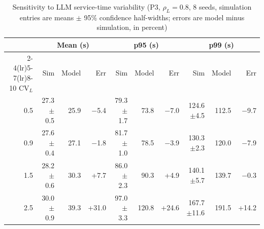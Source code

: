 \documentclass[journal]{IEEEtran}
\begin{document}
\begin{table}[t]
\caption{Sensitivity to LLM service-time variability (P3, $\rho_L=0.8$, 8 seeds, simulation entries are means $\pm$ 95\% confidence half-widths; errors are model minus simulation, in percent)}
\label{tab:cv}
\centering
\footnotesize
\begin{tabular}{rrrrrrrrrr}
\toprule
 & \multicolumn{3}{c}{Mean (s)} & \multicolumn{3}{c}{p95 (s)} & \multicolumn{3}{c}{p99 (s)} \\
\cmidrule(lr){2-4}\cmidrule(lr){5-7}\cmidrule(lr){8-10}
CV$_L$ & Sim & Model & Err & Sim & Model & Err & Sim & Model & Err \\
\midrule
0.5 & 27.3$\pm$0.5 & 25.9 & $-$5.4 & 79.3$\pm$1.7 & 73.8 & $-$7.0 & 124.6$\pm$4.5 & 112.5 & $-$9.7 \\
0.9 & 27.6$\pm$0.4 & 27.1 & $-$1.8 & 81.7$\pm$1.0 & 78.5 & $-$3.9 & 130.3$\pm$2.3 & 120.0 & $-$7.9 \\
1.5 & 28.2$\pm$0.6 & 30.3 & +7.7 & 86.0$\pm$2.3 & 90.3 & +4.9 & 140.1$\pm$5.7 & 139.7 & $-$0.3 \\
2.5 & 30.0$\pm$0.9 & 39.3 & +31.0 & 97.0$\pm$3.3 & 120.8 & +24.6 & 167.7$\pm$11.6 & 191.5 & +14.2 \\
\bottomrule
\end{tabular}
\end{table}
\end{document}
